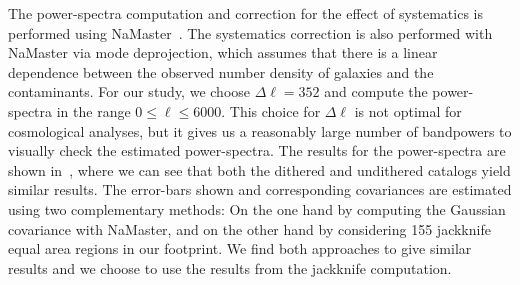 \documentclass[\docopts]{\docclass}
\begin{document}
The power-spectra computation and correction for the effect of systematics is performed using NaMaster~\citep{2019MNRAS.484.4127A}. The systematics correction is also performed with NaMaster via mode deprojection, which assumes that there is a linear dependence between the observed number density of galaxies and the contaminants. For our study, we choose $\Delta \ell = 352$ and compute the power-spectra in the range $0 \leq \ell \leq 6000$. This choice for $\Delta\ell$ is not optimal for cosmological analyses, but it gives us a reasonably large number of bandpowers to visually check the estimated power-spectra. The results for the power-spectra are shown in~, where we can see that both the dithered and undithered catalogs yield similar results. The error-bars shown and corresponding covariances are estimated using two complementary methods: On the one hand by computing the Gaussian covariance with NaMaster, and on the other hand by considering 155 jackknife equal area regions in our footprint. We find both approaches to give similar results and we choose to use the results from the jackknife computation.
\end{document}

